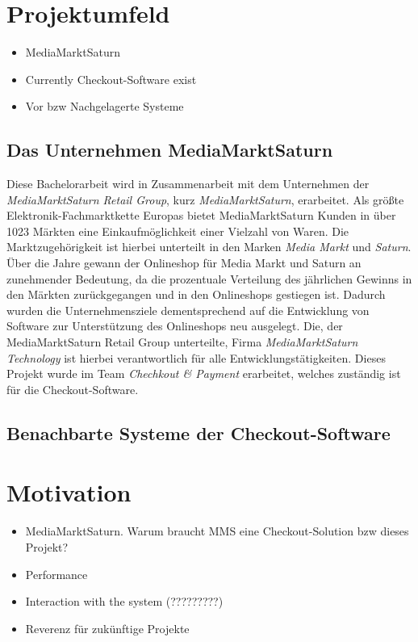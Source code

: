 \section{Projektumfeld}
\begin{itemize}[noitemsep,nolistsep]
	\item MediaMarktSaturn
	\item Currently Checkout-Software exist
	\item Vor bzw Nachgelagerte Systeme
\end{itemize}

\subsection{Das Unternehmen MediaMarktSaturn}


Diese Bachelorarbeit wird in Zusammenarbeit mit dem Unternehmen der \emph{MediaMarktSaturn Retail Group}, kurz \emph{MediaMarktSaturn}, erarbeitet. %
Als größte Elektronik-Fachmarktkette Europas bietet MediaMarktSaturn Kunden in über 1023 Märkten eine Einkaufmöglichkeit einer Vielzahl von Waren. Die Marktzugehörigkeit ist hierbei unterteilt in den Marken \emph{Media Markt} und \emph{Saturn}. %
Über die Jahre gewann der Onlineshop für Media Markt und Saturn an zunehmender Bedeutung, da die prozentuale Verteilung des jährlichen Gewinns in den Märkten zurückgegangen und in den Onlineshops gestiegen ist. Dadurch wurden die Unternehmensziele dementsprechend auf die Entwicklung von Software zur Unterstützung des Onlineshops neu ausgelegt. Die, der MediaMarktSaturn Retail Group unterteilte, Firma \emph{MediaMarktSaturn Technology} ist hierbei verantwortlich für alle Entwicklungstätigkeiten. Dieses Projekt wurde im Team \emph{Chechkout \& Payment} erarbeitet, welches zuständig ist für die Checkout-Software.

\subsection{Benachbarte Systeme der Checkout-Software}

\section{Motivation} 
\begin{itemize}[noitemsep,nolistsep]
	\item MediaMarktSaturn. Warum braucht MMS eine Checkout-Solution bzw dieses Projekt?
	\item Performance
	\item Interaction with the system (?????????)
	\item Reverenz für zukünftige Projekte
\end{itemize}

